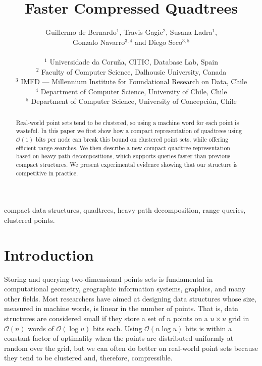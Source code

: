 \documentclass{elsarticle}
\newcommand{\Oh}[1]
  {\ensuremath{\mathcal{O}\!\left( {#1} \right)}}
\begin{document}
\begin{frontmatter}



\title{Faster Compressed Quadtrees}

\author{Guillermo de Bernardo$^1$, Travis Gagie$^2$, 
Susana Ladra$^1$,\\ Gonzalo Navarro$^{3,4}$ and Diego Seco$^{3,5}$\\
\ \\
 $^1$ Universidade da Coruña, CITIC, Database Lab, Spain\\
 $^2$ Faculty of Computer Science, Dalhousie University, Canada\\
 $^3$ IMFD --- Millennium Institute for Foundational Research on Data, Chile\\
 $^4$ Department of Computer Science, University of Chile, Chile\\
 $^5$ Department of Computer Science, University of Concepci\'on, Chile}
\date{}



\begin{abstract}
Real-world point sets tend to be clustered, so using a machine word for each point is wasteful. In this paper we first show how a compact representation of quadtrees using $\Oh{1}$ bits per node can break this bound on clustered point sets, while offering efficient range searches. We then describe a new compact quadtree representation based on heavy path decompositions, which supports queries faster than previous compact structures. We present experimental evidence showing that our structure is competitive in practice.
\end{abstract}

\begin{keyword}
compact data structures, quadtrees, heavy-path decomposition, range queries, clustered points.
\end{keyword}

\end{frontmatter}

\section{Introduction}
\label{sec:introduction}

Storing and querying two-dimensional points sets is fundamental in computational geometry, geographic information systems, graphics, and many other fields.  Most researchers have aimed at designing data structures whose size, measured in machine words, is linear in the number of points.  That is, data structures are considered small if they store a set of $n$ points on a \(u \times u\) grid in $\Oh{n}$ words of $\Oh{\log u}$ bits each.  Using $\Oh{n \log u}$ bits is within a constant factor of optimality when the points are distributed uniformly at random over the grid, but we can often do better on real-world point sets because they tend to be clustered and, therefore, compressible.
\end{document}
